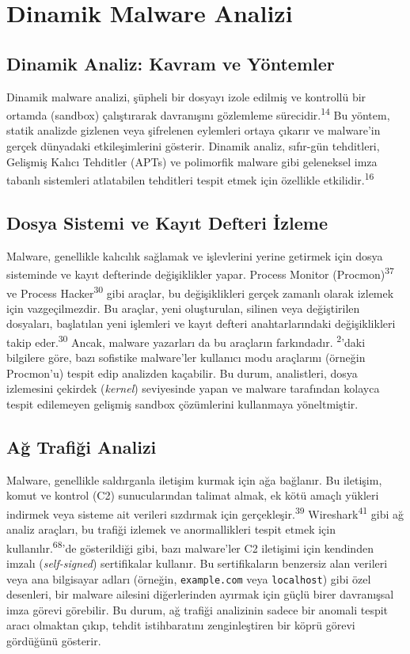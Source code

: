 \section{Dinamik Malware Analizi}

\subsection{Dinamik Analiz: Kavram ve Yöntemler}

Dinamik malware analizi, şüpheli bir dosyayı izole edilmiş ve kontrollü bir ortamda (sandbox) çalıştırarak davranışını gözlemleme sürecidir.\textsuperscript{14} Bu yöntem, statik analizde gizlenen veya şifrelenen eylemleri ortaya çıkarır ve malware'in gerçek dünyadaki etkileşimlerini gösterir. Dinamik analiz, sıfır-gün tehditleri, Gelişmiş Kalıcı Tehditler (APTs) ve polimorfik malware gibi geleneksel imza tabanlı sistemleri atlatabilen tehditleri tespit etmek için özellikle etkilidir.\textsuperscript{16}

\subsection{Dosya Sistemi ve Kayıt Defteri İzleme}

Malware, genellikle kalıcılık sağlamak ve işlevlerini yerine getirmek için dosya sisteminde ve kayıt defterinde değişiklikler yapar. Process Monitor (Procmon)\textsuperscript{37} ve Process Hacker\textsuperscript{30} gibi araçlar, bu değişiklikleri gerçek zamanlı olarak izlemek için vazgeçilmezdir. Bu araçlar, yeni oluşturulan, silinen veya değiştirilen dosyaları, başlatılan yeni işlemleri ve kayıt defteri anahtarlarındaki değişiklikleri takip eder.\textsuperscript{30} Ancak, malware yazarları da bu araçların farkındadır. \textsuperscript{2}'daki bilgilere göre, bazı sofistike malware'ler kullanıcı modu araçlarını (örneğin Procmon'u) tespit edip analizden kaçabilir. Bu durum, analistleri, dosya izlemesini çekirdek (\textit{kernel}) seviyesinde yapan ve malware tarafından kolayca tespit edilemeyen gelişmiş sandbox çözümlerini kullanmaya yöneltmiştir.

\subsection{Ağ Trafiği Analizi}

Malware, genellikle saldırganla iletişim kurmak için ağa bağlanır. Bu iletişim, komut ve kontrol (C2) sunucularından talimat almak, ek kötü amaçlı yükleri indirmek veya sisteme ait verileri sızdırmak için gerçekleşir.\textsuperscript{39} Wireshark\textsuperscript{41} gibi ağ analiz araçları, bu trafiği izlemek ve anormallikleri tespit etmek için kullanılır.\textsuperscript{68}'de gösterildiği gibi, bazı malware'ler C2 iletişimi için kendinden imzalı (\textit{self-signed}) sertifikalar kullanır. Bu sertifikaların benzersiz alan verileri veya ana bilgisayar adları (örneğin, \texttt{example.com} veya \texttt{localhost}) gibi özel desenleri, bir malware ailesini diğerlerinden ayırmak için güçlü birer davranışsal imza görevi görebilir. Bu durum, ağ trafiği analizinin sadece bir anomali tespit aracı olmaktan çıkıp, tehdit istihbaratını zenginleştiren bir köprü görevi gördüğünü gösterir.

